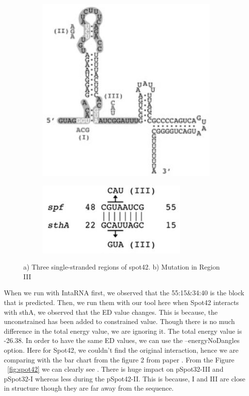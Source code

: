 \documentclass[twoside,a4paper]{report}
\begin{document}
 \begin{figure}[h!tb]
	\centering
	\begin{subfigure}{.5\textwidth}
		\centering
		\includegraphics[width=.9\linewidth]{bei}
		
		\label{fig:bei}
	\end{subfigure}%
	\begin{subfigure}{.5\textwidth}
		\centering
		\includegraphics[width=.6\linewidth]{bei1}
		
		\label{fig:bei1}
	\end{subfigure}
\caption{ a) Three single-stranded regions of spot42. b) Mutation in Region III}
\end{figure}

When we run with IntaRNA first, we observed that the 55:15\&34:40 is the block that is predicted. Then, we run them with our tool here when Spot42 interacts with sthA, we observed that the ED value changes. This is because, the unconstrained has been added to constrained value. Though there is no much difference in the total energy value, we are ignoring it. The total energy value is -26.38. In order to have the same ED values, we can use the --energyNoDangles option. Here for Spot42, we couldn't find the original interaction, hence we are comparing with the bar chart from the figure 2 from paper {\citep{beisel2011base}}. From the Figure ~\ref{fig:spot42} we can clearly see . There is huge impact on pSpot32-III and pSpot32-I whereas less during the pSpot42-II. This is because, I and III are close in structure though they are far away from the sequence.\\
\end{document}
